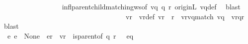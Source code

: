 \begin{isabellebody}
\ \ \ \ \ \ \ \ \ \ \ \ \ \ \ \ \isamarkupfalse%
\ infl{\isacharunderscore}{\kern0pt}parent{\isacharunderscore}{\kern0pt}child{\isacharunderscore}{\kern0pt}matching{\isacharunderscore}{\kern0pt}ws{\isacharbrackleft}{\kern0pt}of\ vq\ q\ r{\isacharbrackright}{\kern0pt}\ orig{\isacharunderscore}{\kern0pt}in{\isacharunderscore}{\kern0pt}L\ vq{\isacharunderscore}{\kern0pt}def\ \isamarkupfalse%
\ blast\isanewline
\ \ \ \ \ \ \ \ \ \ \ \ \ \ \ \ \ \ \isanewline
\ \ \ \ \ \ \ \ \ \ \ \ \ \ \isamarkupfalse%
\ \isamarkupfalse%
\ vr\ \ vr{\isacharunderscore}{\kern0pt}def{\isacharcolon}{\kern0pt}\ {\isachardoublequoteopen}vr\ {\isasymin}\ {\isasymL}\isactrlsup {\isacharasterisk}{\kern0pt}{\isacharparenleft}{\kern0pt}r{\isacharparenright}{\kern0pt}{\isachardoublequoteclose}\ \ vr{\isacharunderscore}{\kern0pt}vq{\isacharunderscore}{\kern0pt}match{\isacharcolon}{\kern0pt}\ {\isachardoublequoteopen}{\isacharparenleft}{\kern0pt}{\isacharparenleft}{\kern0pt}vq{\isasymdown}\isactrlsub {\isacharquery}{\kern0pt}{\isacharparenright}{\kern0pt}{\isasymdown}\isactrlsub {\isacharbang}{\kern0pt}\isactrlsub {\isacharquery}{\kern0pt}{\isacharparenright}{\kern0pt}\ {\isacharequal}{\kern0pt}\ {\isacharparenleft}{\kern0pt}{\isacharparenleft}{\kern0pt}{\isacharparenleft}{\kern0pt}vr{\isasymdown}\isactrlsub {\isacharbraceleft}{\kern0pt}\isactrlsub q\isactrlsub {\isacharcomma}{\kern0pt}\isactrlsub r\isactrlsub {\isacharbraceright}{\kern0pt}{\isacharparenright}{\kern0pt}{\isasymdown}\isactrlsub {\isacharbang}{\kern0pt}{\isacharparenright}{\kern0pt}{\isasymdown}\isactrlsub {\isacharbang}{\kern0pt}\isactrlsub {\isacharquery}{\kern0pt}{\isacharparenright}{\kern0pt}{\isachardoublequoteclose}\ \isamarkupfalse%
\ blast\isanewline
\ \ \ \ \ \ \ \ \ \ \ \ \ \ \ \ \ \ \isanewline
\ \ \ \ \ \ \ \ \ \ \ \ \ \ \isamarkupfalse%
\ {\isachardoublequoteopen}{\isasymexists}\ e{\isachardot}{\kern0pt}\ {\isacharparenleft}{\kern0pt}e\ {\isasymin}\ {\isasymT}\isactrlbsub None\isactrlesub \ {\isasymand}\ e{\isasymdown}\isactrlsub r\ {\isacharequal}{\kern0pt}\ vr\ {\isasymand}\ {\isacharparenleft}{\kern0pt}{\isacharparenleft}{\kern0pt}is{\isacharunderscore}{\kern0pt}parent{\isacharunderscore}{\kern0pt}of\ q\ r{\isacharparenright}{\kern0pt}\ {\isasymlongrightarrow}\ \ e{\isasymdown}\isactrlsub q\ {\isacharequal}{\kern0pt}\ {\isasymepsilon}{\isacharparenright}{\kern0pt}{\isacharparenright}{\kern0pt}{\isachardoublequoteclose}\ \ \isamarkupfalse%

\end{isabellebody}
